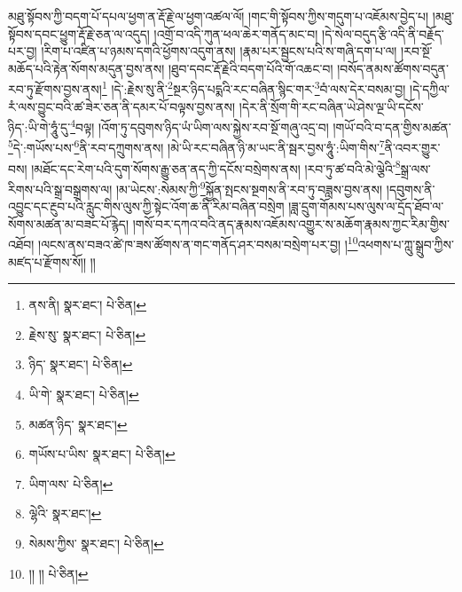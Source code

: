 \setcounter{footnote}{0} 
མཐུ་སྟོབས་ཀྱི་བདག་པོ་དཔལ་ཕྱག་ན་རྡོ་རྗེ་ལ་ཕྱག་འཚལ་ལོ། །གང་གི་སྟོབས་ཀྱིས་གདུག་པ་འཇོམས་བྱེད་པ། །མཐུ་སྟོབས་དབང་ཕྱུག་རྡོ་རྗེ་ཅན་ལ་འདུད། །འགྲོ་བ་འདི་ཀུན་ཕལ་ཆེར་གནོད་མང་བ། །དེ་སེལ་བདུད་རྩི་འདི་ནི་བརྗོད་པར་བྱ། །རིག་པ་འཛིན་པ་ཉམས་དགའི་ཕྱོགས་འདུག་ནས། །རྣམ་པར་སྦྱངས་པའི་ས་གཞི་དག་པ་ལ། །རབ་སྔོ་མཆོད་པའི་རྟེན་སོགས་མདུན་བྱས་ནས། །ཐུབ་དབང་རྡོ་རྗེའི་བདག་པོའི་གོ་འཆང་བ། །བསོད་ནམས་ཚོགས་བདུན་རབ་ཏུ་རྫོགས་བྱས་ནས།\footnote{ནས་ནི།  སྣར་ཐང་།  པེ་ཅིན། } །དེ་:རྗེས་སུ་ནི་\footnote{རྗེས་སུ་  སྣར་ཐང་།  པེ་ཅིན། }སྔར་ཉིད་པདྨའི་རང་བཞིན་སྙིང་གར་\footnote{ཉིད་  སྣར་ཐང་།  པེ་ཅིན། }བཾ་ལས་དེར་བསམ་བྱ། །དེ་དཀྱིལ་རཾ་ལས་བྱུང་བའི་ཚ་ཟེར་ཅན་ནི་དམར་པོ་བལྟས་བྱས་ནས། །དེར་ནི་སྲོག་གི་རང་བཞིན་ཡེ་ཤེས་ལྔ་ཡི་དངོས་ཉིད་:ཡི་གེ་ཧཱུཾ་དུ་\footnote{ཡི་གེ་  སྣར་ཐང་།  པེ་ཅིན། }བལྟ། །འོག་ཏུ་དབུགས་ཉིད་ཡཾ་ཡིག་ལས་སྐྱེས་རབ་སྔོ་གཞུ་འདྲ་བ། །གཡོ་བའི་བ་དན་གྱིས་མཚན་\footnote{མཚན་ཉིད་  སྣར་ཐང་། }དེ་:གཡོས་པས་\footnote{གཡོས་པ་ཡིས་  སྣར་ཐང་།  པེ་ཅིན། }ནི་རབ་དཀྲུགས་ནས། །མེ་ཡི་རང་བཞིན་ཉི་མ་ཡང་ནི་སྦར་བྱས་ཧཱུཾ་:ཡིག་གིས་\footnote{ཡིག་ལས་  པེ་ཅིན། }ནི་འབར་གྱུར་བས། །མཐོང་དང་རེག་པའི་དུག་སོགས་རྒྱུ་ཅན་ནད་ཀྱི་དངོས་བསྲེགས་ནས། །རབ་ཏུ་ཚ་བའི་མེ་ལྕེའི་\footnote{ལྷེའི་  སྣར་ཐང་། }སྒྲ་ལས་རིགས་པའི་སྒྲ་བསྒྲགས་ལ། །མ་ཡེངས་:སེམས་ཀྱི་\footnote{སེམས་ཀྱིས་  སྣར་ཐང་།  པེ་ཅིན། }སྐྱོན་སྤངས་སྔགས་ནི་རབ་ཏུ་བཟླས་བྱས་ནས། །དབུགས་ནི་འབྱུང་དང་རྔུབ་པའི་རླུང་གིས་ལུས་ཀྱི་སྟེང་འོག་ཆ་ནི་རིམ་བཞིན་བསྲེག །ཟླ་དྲུག་གོམས་པས་ལུས་ལ་དྲོད་ཐོབ་ལ་སོགས་མཚན་མ་བཟང་པོ་རྙེད། །གསོ་བར་དཀའ་བའི་ནད་རྣམས་འཇོམས་འགྱུར་ས་མཆོག་རྣམས་ཀྱང་རིམ་གྱིས་འཐོབ། །ལངས་ནས་བཟའ་ཚེ་ཁ་ཟས་ཚོགས་ན་གང་གནོད་ཤར་བསམ་བསྲེག་པར་བྱ། །\footnote{།། །།  པེ་ཅིན། }འཕགས་པ་ཀླུ་སྒྲུབ་ཀྱིས་མཛད་པ་རྫོགས་སོ།། །།